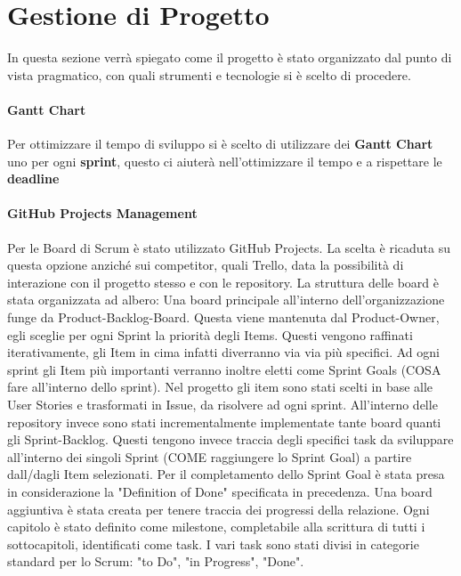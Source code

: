     
    
    

\section{Gestione di Progetto}
In questa sezione verrà spiegato come il progetto è stato organizzato dal punto di vista pragmatico, con quali strumenti e tecnologie si è scelto di procedere.
    \paragraph{Gantt Chart} Per ottimizzare il tempo di sviluppo si è scelto di utilizzare dei \textbf{Gantt Chart} uno per ogni \textbf{sprint}, questo ci aiuterà nell'ottimizzare il tempo e a rispettare le \textbf{deadline}
    
    \paragraph{GitHub Projects Management}
    Per le Board di Scrum è stato utilizzato GitHub Projects. La scelta è ricaduta su questa opzione anziché sui competitor, quali Trello, data la possibilità di interazione con il progetto stesso e con le repository. 
    La struttura delle board è stata organizzata ad albero:
    Una board principale all'interno dell'organizzazione funge da Product-Backlog-Board. Questa viene mantenuta dal Product-Owner, egli sceglie per ogni Sprint la priorità degli Items. Questi vengono raffinati iterativamente, gli Item in cima infatti diverranno via via più specifici. Ad ogni sprint gli Item più importanti verranno inoltre eletti come Sprint Goals (COSA fare all'interno dello sprint). 
    Nel progetto gli item sono stati scelti in base alle User Stories e trasformati in Issue, da risolvere ad ogni sprint.
    All'interno delle repository invece sono stati incrementalmente implementate tante board quanti gli Sprint-Backlog. Questi tengono invece traccia degli specifici task da sviluppare all'interno dei singoli Sprint (COME raggiungere lo Sprint Goal) a partire dall/dagli Item selezionati. 
    Per il completamento dello Sprint Goal è stata presa in considerazione  la "Definition of Done" specificata in precedenza.
    Una board aggiuntiva è stata creata per tenere traccia dei progressi della relazione. Ogni capitolo è stato definito come milestone, completabile alla scrittura di tutti i sottocapitoli, identificati come task.
    I vari task sono stati divisi in categorie standard per lo Scrum: "to Do", "in Progress", "Done".
    
